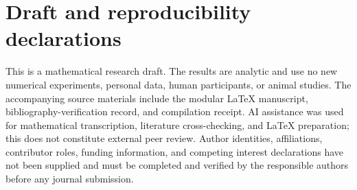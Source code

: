 \section*{Draft and reproducibility declarations}

This is a mathematical research draft. The results are analytic and
use no new numerical experiments, personal data, human participants,
or animal studies. The accompanying source materials include the
modular \LaTeX{} manuscript, bibliography-verification record, and
compilation receipt. AI assistance was used for mathematical
transcription, literature cross-checking, and \LaTeX{} preparation;
this does not constitute external peer review. Author identities,
affiliations, contributor roles, funding information, and competing
interest declarations have not been supplied and must be completed
and verified by the responsible authors before any journal submission.
